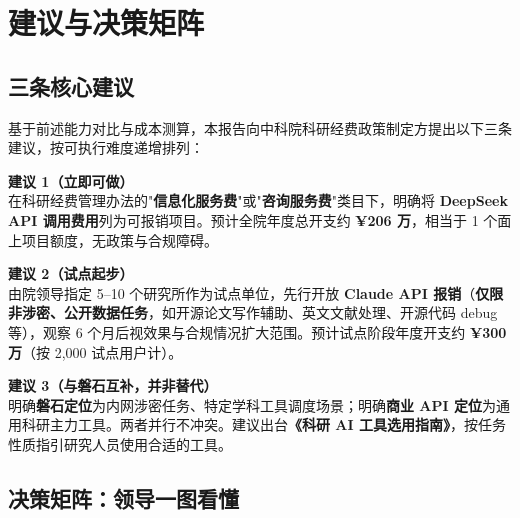 \section{建议与决策矩阵}
\label{sec:recommendations}

\subsection{三条核心建议}

基于前述能力对比与成本测算，本报告向中科院科研经费政策制定方提出以下三条建议，按可执行难度递增排列：

\medskip

\begin{tcolorbox}[colback=primary!8,colframe=primary,boxrule=0.6pt,arc=2pt,
                  left=10pt,right=10pt,top=8pt,bottom=8pt]
\sffamily\textbf{建议 1（立即可做）}\\[3pt]
\normalfont
在科研经费管理办法的"\textbf{信息化服务费}"或"\textbf{咨询服务费}"类目下，明确将\textbf{ DeepSeek API 调用费用}列为可报销项目。预计全院年度总开支约 \textbf{¥206 万}，相当于 1 个面上项目额度，无政策与合规障碍。
\end{tcolorbox}

\medskip

\begin{tcolorbox}[colback=primary!8,colframe=primary,boxrule=0.6pt,arc=2pt,
                  left=10pt,right=10pt,top=8pt,bottom=8pt]
\sffamily\textbf{建议 2（试点起步）}\\[3pt]
\normalfont
由院领导指定 5--10 个研究所作为试点单位，先行开放\textbf{ Claude API 报销}（\textbf{仅限非涉密、公开数据任务}，如开源论文写作辅助、英文文献处理、开源代码 debug 等），观察 6 个月后视效果与合规情况扩大范围。预计试点阶段年度开支约 \textbf{¥300 万}（按 2,000 试点用户计）。
\end{tcolorbox}

\medskip

\begin{tcolorbox}[colback=primary!8,colframe=primary,boxrule=0.6pt,arc=2pt,
                  left=10pt,right=10pt,top=8pt,bottom=8pt]
\sffamily\textbf{建议 3（与磐石互补，并非替代）}\\[3pt]
\normalfont
明确\textbf{磐石定位}为内网涉密任务、特定学科工具调度场景；明确\textbf{商业 API 定位}为通用科研主力工具。两者并行不冲突。建议出台\textbf{《科研 AI 工具选用指南》}，按任务性质指引研究人员使用合适的工具。
\end{tcolorbox}

\subsection{决策矩阵：领导一图看懂}

